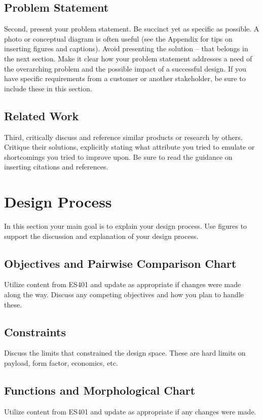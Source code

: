 \documentclass{wrcecapstone}
\begin{document}
\subsection{Problem Statement}
Second, present your problem statement.   Be succinct yet as specific as possible.  A photo or conceptual diagram is often useful (see the Appendix for tips on inserting figures and captions).   Avoid presenting the solution – that belongs in the next section.  Make it clear how your problem statement addresses a need of the overarching problem and the possible impact of a successful design.  If you have specific requirements from a customer or another stakeholder, be sure to include these in this section.

\subsection{Related Work}
Third, critically discuss and reference similar products or research by others.  Critique their solutions, explicitly stating what attribute you tried to emulate or shortcomings you tried to improve upon.  Be sure to read the guidance on inserting citations and references.





\section{Design Process}
In this section your main goal is to explain your design process. Use figures to support the discussion and explanation of your design process.
 
\subsection{Objectives and Pairwise Comparison Chart}
Utilize content from ES401 and update as appropriate if changes were made along the way. Discuss any competing objectives and how you plan to handle these.

\subsection{Constraints}
Discuss the limits that constrained the design space. These are hard limits on payload, form factor, economics, etc. 

\subsection{Functions and Morphological Chart}
Utilize content from ES401 and update as appropriate if any changes were made. 
\end{document}
